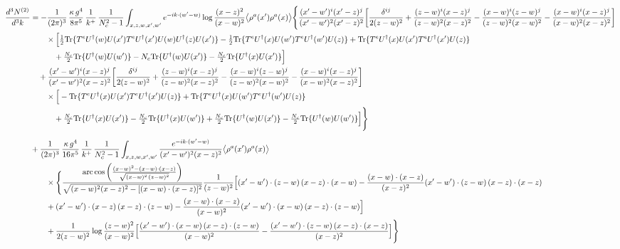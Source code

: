 \documentclass[10pt]{article}
\begin{document}
\begin{align}
\frac{d^{3}N^{(2)}}{d^{3}k}&=-\frac{1}{(2\pi)^{3}}\,\frac{\kappa\,g^{4}}{8\pi^{5}}\,\frac{1}{k^{+}}\,\frac{1}{N_{c}^{2}-1}\int_{x,z,w,x',w'}e^{-ik\cdot(w'-w)}\log\frac{(x-z)^{2}}{(x-w)^{2}}\big\langle\rho^{a}(x')\rho^{a}(x)\big\rangle\Bigg\{\frac{(x'-w')^{i}(x'-z)^{j}}{(x'-w')^{2}(x'-z)^{2}}\bigg[\frac{\delta^{ij}}{2(z-w)^{2}}+\frac{(z-w)^{i}(x-z)^{j}}{(z-w)^{2}(x-z)^{2}}-\frac{(x-w)^{i}(z-w)^{j}}{(z-w)^{2}(x-w)^{2}}-\frac{(x-w)^{i}(x-z)^{j}}{(x-w)^{2}(x-z)^{2}}\bigg]\notag\\
&\qquad\times\Big[\tfrac12{\rm Tr}\{T^{e}U^{\dagger}(w)U(x')T^{e}U^{\dagger}(x')U(w)U^{\dagger}(z)U(x')\}-\tfrac12{\rm Tr}\{T^{e}U^{\dagger}(x)U(w')T^{e}U^{\dagger}(w')U(z)\}+{\rm Tr}\{T^{e}U^{\dagger}(x)U(x')T^{e}U^{\dagger}(x')U(z)\}\notag\\
&\qquad\quad+\tfrac{N_{c}}{2}{\rm Tr}\{U^{\dagger}(w)U(w')\}-N_{c}{\rm Tr}\{U^{\dagger}(w)U(x')\}-\tfrac{N_{c}}{2}{\rm Tr}\{U^{\dagger}(x)U(x')\}\Big]\notag\\
&\quad+\frac{(x'-w')^{i}(x-z)^{j}}{(x'-w')^{2}(x-z)^{2}}\bigg[\frac{\delta^{ij}}{2(z-w)^{2}}+\frac{(z-w)^{i}(x-z)^{j}}{(z-w)^{2}(x-z)^{2}}-\frac{(x-w)^{i}(z-w)^{j}}{(z-w)^{2}(x-w)^{2}}-\frac{(x-w)^{i}(x-z)^{j}}{(x-w)^{2}(x-z)^{2}}\bigg]\notag\\
&\qquad\times\Big[-{\rm Tr}\{T^{e}U^{\dagger}(x)U(x')T^{e}U^{\dagger}(x')U(z)\}+{\rm Tr}\{T^{e}U^{\dagger}(x)U(w')T^{e}U^{\dagger}(w')U(z)\}\notag\\
&\qquad\quad+\tfrac{N_{c}}{2}{\rm Tr}\{U^{\dagger}(x)U(x')\}-\tfrac{N_{c}}{2}{\rm Tr}\{U^{\dagger}(x)U(w')\}+\tfrac{N_{c}}{2}{\rm Tr}\{U^{\dagger}(w)U(x')\}-\tfrac{N_{c}}{2}{\rm Tr}\{U^{\dagger}(w)U(w')\}\Big]\Bigg\}\notag\\[6pt]
&+\frac{1}{(2\pi)^{3}}\,\frac{\kappa\,g^{4}}{16\pi^{5}}\,\frac{1}{k^{+}}\,\frac{1}{N_{c}^{2}-1}\int_{x,z,w,x',w'}\frac{e^{-ik\cdot(w'-w)}}{(x'-w')^{2}(x-z)^{2}}\big\langle\rho^{a}(x')\rho^{a}(x)\big\rangle\notag\\
&\qquad\times\Bigg\{\frac{\mathrm{arc\,cos}\left(\frac{(x-w)^{2}-(x-w)\cdot (x-z)}{\sqrt{(x-w)^{2}\,(z-w)^{2}}}\right)}{\sqrt{(x-w)^{2}(x-z)^{2}-[(x-w)\cdot(x-z)]^{2}}}\frac{1}{(z-w)^{2}}\Big[(x'-w')\cdot(z-w)\,(x-z)\cdot(x-w)-\frac{(x-w)\cdot(x-z)}{(x-z)^{2}}(x'-w')\cdot(z-w)\,(x-z)\cdot(x-z)\notag\\
&\qquad+(x'-w')\cdot(x-z)\,(x-z)\cdot(z-w)-\frac{(x-w)\cdot(x-z)}{(x-w)^{2}}(x'-w')\cdot(x-w)\,(x-z)\cdot(z-w)\Big]\notag\\
&\qquad+\frac{1}{2(z-w)^{2}}\log\frac{(z-w)^{2}}{(x-w)^{2}}\Big[\frac{(x'-w')\cdot(x-w)\,(x-z)\cdot(z-w)}{(x-w)^{2}}-\frac{(x'-w')\cdot(z-w)\,(x-z)\cdot(x-z)}{(x-z)^{2}}\Big]\Bigg\}\notag\\

\end{align}
\end{document}
